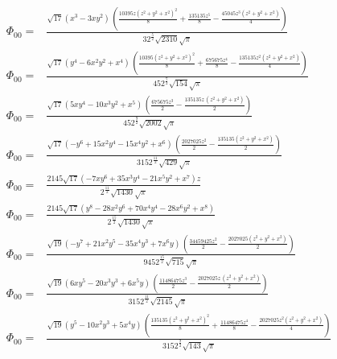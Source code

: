 \documentclass[10pt]{article}
\begin{document}
\begin{align*}
\Phi_{00} = &\frac{\sqrt{17} \left( {{x}^{3}}-3 x {{y}^{2}}\right) \, \left( \frac{10395 z {{\left( {{z}^{2}}+{{y}^{2}}+{{x}^{2}}\right) }^{2}}}{8}+\frac{135135 {{z}^{5}}}{8}-\frac{45045 {{z}^{3}} \left( {{z}^{2}}+{{y}^{2}}+{{x}^{2}}\right) }{4}\right) }{3 {{2}^{\frac{5}{2}}} \sqrt{2310} \sqrt{\ensuremath{\pi} }}\\
\Phi_{00} = &\frac{\sqrt{17} \left( {{y}^{4}}-6 {{x}^{2}} {{y}^{2}}+{{x}^{4}}\right) \, \left( \frac{10395 {{\left( {{z}^{2}}+{{y}^{2}}+{{x}^{2}}\right) }^{2}}}{8}+\frac{675675 {{z}^{4}}}{8}-\frac{135135 {{z}^{2}} \left( {{z}^{2}}+{{y}^{2}}+{{x}^{2}}\right) }{4}\right) }{45 {{2}^{\frac{7}{2}}} \sqrt{154} \sqrt{\ensuremath{\pi} }}\\
\Phi_{00} = &\frac{\sqrt{17} \left( 5 x {{y}^{4}}-10 {{x}^{3}} {{y}^{2}}+{{x}^{5}}\right) \, \left( \frac{675675 {{z}^{3}}}{2}-\frac{135135 z\, \left( {{z}^{2}}+{{y}^{2}}+{{x}^{2}}\right) }{2}\right) }{45 {{2}^{\frac{9}{2}}} \sqrt{2002} \sqrt{\ensuremath{\pi} }}\\
\Phi_{00} = &\frac{\sqrt{17} \left( -{{y}^{6}}+15 {{x}^{2}} {{y}^{4}}-15 {{x}^{4}} {{y}^{2}}+{{x}^{6}}\right) \, \left( \frac{2027025 {{z}^{2}}}{2}-\frac{135135 \left( {{z}^{2}}+{{y}^{2}}+{{x}^{2}}\right) }{2}\right) }{315 {{2}^{\frac{11}{2}}} \sqrt{429} \sqrt{\ensuremath{\pi} }}\\
\Phi_{00} = &\frac{2145 \sqrt{17} \left( -7 x {{y}^{6}}+35 {{x}^{3}} {{y}^{4}}-21 {{x}^{5}} {{y}^{2}}+{{x}^{7}}\right)  z}{{{2}^{\frac{11}{2}}} \sqrt{1430} \sqrt{\ensuremath{\pi} }}\\
\Phi_{00} = &\frac{2145 \sqrt{17} \left( {{y}^{8}}-28 {{x}^{2}} {{y}^{6}}+70 {{x}^{4}} {{y}^{4}}-28 {{x}^{6}} {{y}^{2}}+{{x}^{8}}\right) }{{{2}^{\frac{15}{2}}} \sqrt{1430} \sqrt{\ensuremath{\pi} }}\\
%
\Phi_{00} = &\frac{\sqrt{19} \left( -{{y}^{7}}+21 {{x}^{2}} {{y}^{5}}-35 {{x}^{4}} {{y}^{3}}+7 {{x}^{6}} y\right) \, \left( \frac{34459425 {{z}^{2}}}{2}-\frac{2027025 \left( {{z}^{2}}+{{y}^{2}}+{{x}^{2}}\right) }{2}\right) }{945 {{2}^{\frac{15}{2}}} \sqrt{715} \sqrt{\ensuremath{\pi} }}\\
\Phi_{00} = &\frac{\sqrt{19} \left( 6 x {{y}^{5}}-20 {{x}^{3}} {{y}^{3}}+6 {{x}^{5}} y\right) \, \left( \frac{11486475 {{z}^{3}}}{2}-\frac{2027025 z\, \left( {{z}^{2}}+{{y}^{2}}+{{x}^{2}}\right) }{2}\right) }{315 {{2}^{\frac{11}{2}}} \sqrt{2145} \sqrt{\ensuremath{\pi} }}\\
\Phi_{00} = &\frac{\sqrt{19} \left( {{y}^{5}}-10 {{x}^{2}} {{y}^{3}}+5 {{x}^{4}} y\right) \, \left( \frac{135135 {{\left( {{z}^{2}}+{{y}^{2}}+{{x}^{2}}\right) }^{2}}}{8}+\frac{11486475 {{z}^{4}}}{8}-\frac{2027025 {{z}^{2}} \left( {{z}^{2}}+{{y}^{2}}+{{x}^{2}}\right) }{4}\right) }{315 {{2}^{\frac{9}{2}}} \sqrt{143} \sqrt{\ensuremath{\pi} }}\\

\end{align*}
\end{document}

